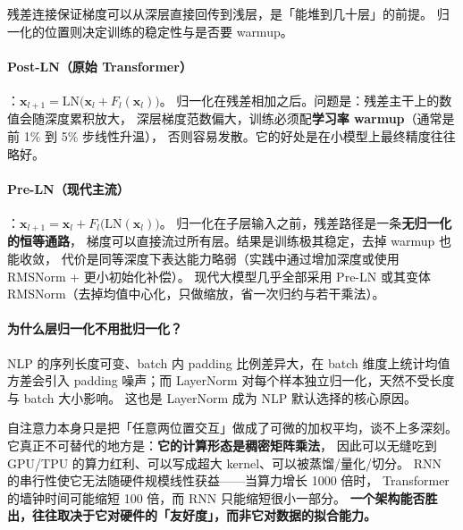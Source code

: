 残差连接保证梯度可以从深层直接回传到浅层，是「能堆到几十层」的前提。
归一化的位置则决定训练的稳定性与是否要 warmup。

\paragraph{Post-LN（原始 Transformer）}：$\bm{x}_{l+1} = \text{LN}\big(\bm{x}_l + F_l(\bm{x}_l)\big)$。
归一化在残差相加之后。问题是：残差主干上的数值会随深度累积放大，
深层梯度范数偏大，训练必须配\textbf{学习率 warmup}（通常是前 1\% 到 5\% 步线性升温），
否则容易发散。它的好处是在小模型上最终精度往往略好。

\paragraph{Pre-LN（现代主流）}：$\bm{x}_{l+1} = \bm{x}_l + F_l\big(\text{LN}(\bm{x}_l)\big)$。
归一化在子层输入之前，残差路径是一条\textbf{无归一化的恒等通路}，
梯度可以直接流过所有层。结果是训练极其稳定，去掉 warmup 也能收敛，
代价是同等深度下表达能力略弱（实践中通过增加深度或使用 RMSNorm + 更小初始化补偿）。
现代大模型几乎全部采用 Pre-LN 或其变体 RMSNorm（去掉均值中心化，只做缩放，省一次归约与若干乘法）。

\paragraph{为什么层归一化不用批归一化？}
NLP 的序列长度可变、batch 内 padding 比例差异大，在 batch 维度上统计均值方差会引入
padding 噪声；而 LayerNorm 对每个样本独立归一化，天然不受长度与 batch 大小影响。
这也是 LayerNorm 成为 NLP 默认选择的核心原因。

\begin{insight}
自注意力本身只是把「任意两位置交互」做成了可微的加权平均，谈不上多深刻。
它真正不可替代的地方是：\textbf{它的计算形态是稠密矩阵乘法}，
因此可以无缝吃到 GPU/TPU 的算力红利、可以写成超大 kernel、可以被蒸馏/量化/切分。
RNN 的串行性使它无法随硬件规模线性获益——当算力增长 1000 倍时，
Transformer 的墙钟时间可能缩短 100 倍，而 RNN 只能缩短很小一部分。
\textbf{一个架构能否胜出，往往取决于它对硬件的「友好度」，而非它对数据的拟合能力。}
\end{insight}

